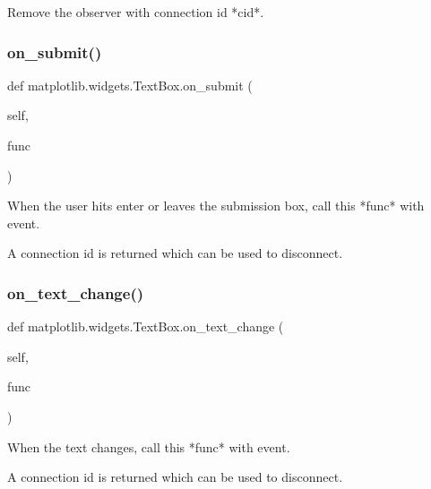 \begin{DoxyVerb}Remove the observer with connection id *cid*.\end{DoxyVerb}
 \mbox{\label{classmatplotlib_1_1widgets_1_1TextBox_a99841a2730d45a63e6745626f9576338}} 
\subsubsection{\texorpdfstring{on\+\_\+submit()}{on\_submit()}}
{\footnotesize\ttfamily def matplotlib.\+widgets.\+Text\+Box.\+on\+\_\+submit (\begin{DoxyParamCaption}\item[{}]{self,  }\item[{}]{func }\end{DoxyParamCaption})}

\begin{DoxyVerb}When the user hits enter or leaves the submission box, call this
*func* with event.

A connection id is returned which can be used to disconnect.
\end{DoxyVerb}
 \mbox{\label{classmatplotlib_1_1widgets_1_1TextBox_a8d976d6a87d70d4bcf4ee7f76f65fc12}} 
\subsubsection{\texorpdfstring{on\+\_\+text\+\_\+change()}{on\_text\_change()}}
{\footnotesize\ttfamily def matplotlib.\+widgets.\+Text\+Box.\+on\+\_\+text\+\_\+change (\begin{DoxyParamCaption}\item[{}]{self,  }\item[{}]{func }\end{DoxyParamCaption})}

\begin{DoxyVerb}When the text changes, call this *func* with event.

A connection id is returned which can be used to disconnect.
\end{DoxyVerb}
 \mbox{\label{classmatplotlib_1_1widgets_1_1TextBox_a52fbe17d4504d714763d2fb086134571}} 
